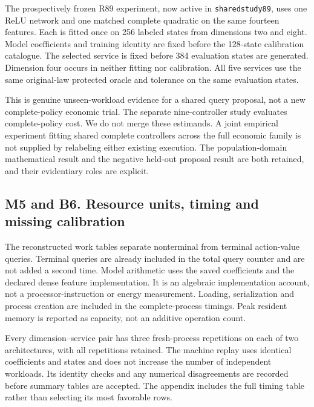 The prospectively frozen R89 experiment, now active in
\texttt{sharedstudy89}, uses one ReLU network and one matched complete
quadratic on the same fourteen features. Each is fitted once on 256
labeled states from dimensions two and eight. Model coefficients and
training identity are fixed before the 128-state calibration catalogue.
The selected service is fixed before 384 evaluation states are
generated. Dimension four occurs in neither fitting nor calibration. All
five services use the same original-law protected oracle and tolerance
on the same evaluation states.

This is genuine unseen-workload evidence for a shared query proposal,
not a new complete-policy economic trial. The separate nine-controller
study evaluates complete-policy cost. We do not merge these estimands. A
joint empirical experiment fitting shared complete controllers across
the full economic family is not supplied by relabeling either existing
execution. The population-domain mathematical result and the negative
held-out proposal result are both retained, and their evidentiary roles
are explicit.

\hypertarget{m5-and-b6.-resource-units-timing-and-missing-calibration}{%
\subsection{M5 and B6. Resource units, timing and missing
calibration}\label{m5-and-b6.-resource-units-timing-and-missing-calibration}}

The reconstructed work tables separate nonterminal from terminal
action-value queries. Terminal queries are already included in the total
query counter and are not added a second time. Model arithmetic uses the
saved coefficients and the declared dense feature implementation. It is
an algebraic implementation account, not a processor-instruction or
energy measurement. Loading, serialization and process creation are
included in the complete-process timings. Peak resident memory is
reported as capacity, not an additive operation count.

Every dimension--service pair has three fresh-process repetitions on
each of two architectures, with all repetitions retained. The machine
replay uses identical coefficients and states and does not increase the
number of independent workloads. Its identity checks and any numerical
disagreements are recorded before summary tables are accepted. The
appendix includes the full timing table rather than selecting its most
favorable rows.

